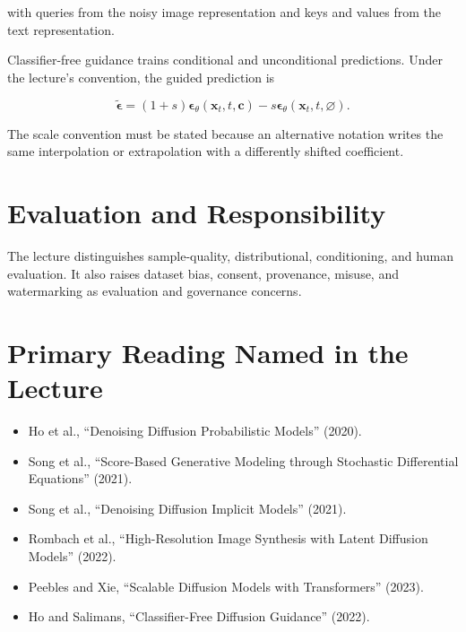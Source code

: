 \documentclass{article}
\begin{document}
with queries from the noisy image representation and keys and values from the text
representation.

Classifier-free guidance trains conditional and unconditional predictions. Under the
lecture's convention, the guided prediction is

\[
\tilde{\boldsymbol{\epsilon}}
=(1+s)\boldsymbol{\epsilon}_{\theta}(\mathbf{x}_t,t,\mathbf{c})
-s\boldsymbol{\epsilon}_{\theta}(\mathbf{x}_t,t,\varnothing).
\]

The scale convention must be stated because an alternative notation writes the same
interpolation or extrapolation with a differently shifted coefficient.


\section{Evaluation and Responsibility}

The lecture distinguishes sample-quality, distributional, conditioning, and human
evaluation. It also raises dataset bias, consent, provenance, misuse, and watermarking
as evaluation and governance concerns.


\section{Primary Reading Named in the Lecture}

\begin{itemize}
\item Ho et al., ``Denoising Diffusion Probabilistic Models'' (2020).
\item Song et al., ``Score-Based Generative Modeling through Stochastic Differential
Equations'' (2021).
\item Song et al., ``Denoising Diffusion Implicit Models'' (2021).
\item Rombach et al., ``High-Resolution Image Synthesis with Latent Diffusion Models''
(2022).
\item Peebles and Xie, ``Scalable Diffusion Models with Transformers'' (2023).
\item Ho and Salimans, ``Classifier-Free Diffusion Guidance'' (2022).
\end{itemize}

\end{document}
